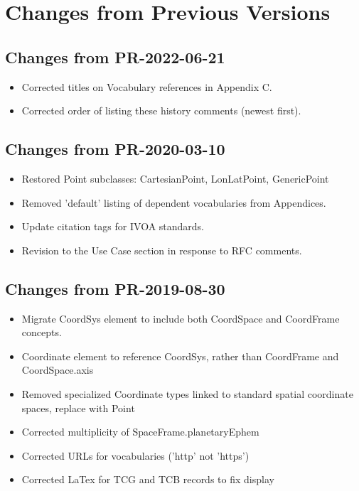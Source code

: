 \pagebreak
\section{Changes from Previous Versions}


\subsection{Changes from PR-2022-06-21}
\begin{itemize} 
  \item Corrected titles on Vocabulary references in Appendix C.
  \item Corrected order of listing these history comments (newest first).
\end{itemize}
\subsection{Changes from PR-2020-03-10}
\begin{itemize} 
  \item Restored Point subclasses: CartesianPoint, LonLatPoint, GenericPoint
  \item Removed 'default' listing of dependent vocabularies from Appendices.
  \item Update citation tags for IVOA standards.
  \item Revision to the Use Case section in response to RFC comments.
\end{itemize}
\subsection{Changes from PR-2019-08-30}
\begin{itemize} 
  \item Migrate CoordSys element to include both CoordSpace and CoordFrame concepts.
  \item Coordinate element to reference CoordSys, rather than CoordFrame and CoordSpace.axis
  \item Removed specialized Coordinate types linked to standard spatial coordinate spaces, replace with Point
  \item Corrected multiplicity of SpaceFrame.planetaryEphem
  \item Corrected URLs for vocabularies ('http' not 'https')
  \item Corrected LaTex for TCG and TCB records to fix display 
\end{itemize}
